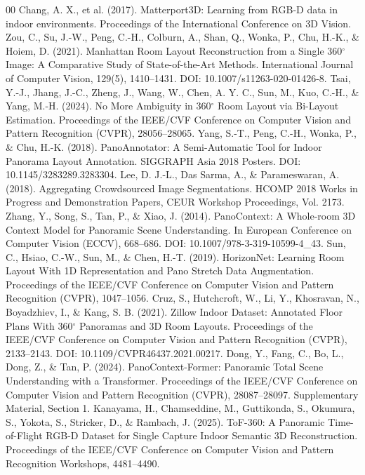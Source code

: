 \documentclass[final,5p,twocolumn]{elsarticle}
\begin{document}
\setlength{\bibsep}{2pt plus 1pt minus 1pt}
\begin{thebibliography}{00}
 Chang, A. X., et al. (2017). Matterport3D: Learning from RGB-D data in indoor environments. Proceedings of the International Conference on 3D Vision.
 Zou, C., Su, J.-W., Peng, C.-H., Colburn, A., Shan, Q., Wonka, P., Chu, H.-K., \& Hoiem, D. (2021). Manhattan Room Layout Reconstruction from a Single 360$^\circ$ Image: A Comparative Study of State-of-the-Art Methods. International Journal of Computer Vision, 129(5), 1410--1431. DOI: 10.1007/s11263-020-01426-8.
 Tsai, Y.-J., Jhang, J.-C., Zheng, J., Wang, W., Chen, A. Y. C., Sun, M., Kuo, C.-H., \& Yang, M.-H. (2024). No More Ambiguity in 360$^\circ$ Room Layout via Bi-Layout Estimation. Proceedings of the IEEE/CVF Conference on Computer Vision and Pattern Recognition (CVPR), 28056--28065.
 Yang, S.-T., Peng, C.-H., Wonka, P., \& Chu, H.-K. (2018). PanoAnnotator: A Semi-Automatic Tool for Indoor Panorama Layout Annotation. SIGGRAPH Asia 2018 Posters. DOI: 10.1145/3283289.3283304.
 Lee, D. J.-L., Das Sarma, A., \& Parameswaran, A. (2018). Aggregating Crowdsourced Image Segmentations. HCOMP 2018 Works in Progress and Demonstration Papers, CEUR Workshop Proceedings, Vol. 2173.
 Zhang, Y., Song, S., Tan, P., \& Xiao, J. (2014). PanoContext: A Whole-room 3D Context Model for Panoramic Scene Understanding. In European Conference on Computer Vision (ECCV), 668--686. DOI: 10.1007/978-3-319-10599-4\_43.
 Sun, C., Hsiao, C.-W., Sun, M., \& Chen, H.-T. (2019). HorizonNet: Learning Room Layout With 1D Representation and Pano Stretch Data Augmentation. Proceedings of the IEEE/CVF Conference on Computer Vision and Pattern Recognition (CVPR), 1047--1056.
 Cruz, S., Hutchcroft, W., Li, Y., Khosravan, N., Boyadzhiev, I., \& Kang, S. B. (2021). Zillow Indoor Dataset: Annotated Floor Plans With 360$^\circ$ Panoramas and 3D Room Layouts. Proceedings of the IEEE/CVF Conference on Computer Vision and Pattern Recognition (CVPR), 2133--2143. DOI: 10.1109/CVPR46437.2021.00217.
 Dong, Y., Fang, C., Bo, L., Dong, Z., \& Tan, P. (2024). PanoContext-Former: Panoramic Total Scene Understanding with a Transformer. Proceedings of the IEEE/CVF Conference on Computer Vision and Pattern Recognition (CVPR), 28087--28097. Supplementary Material, Section 1.
 Kanayama, H., Chamseddine, M., Guttikonda, S., Okumura, S., Yokota, S., Stricker, D., \& Rambach, J. (2025). ToF-360: A Panoramic Time-of-Flight RGB-D Dataset for Single Capture Indoor Semantic 3D Reconstruction. Proceedings of the IEEE/CVF Conference on Computer Vision and Pattern Recognition Workshops, 4481--4490.

\end{thebibliography}
\end{document}
